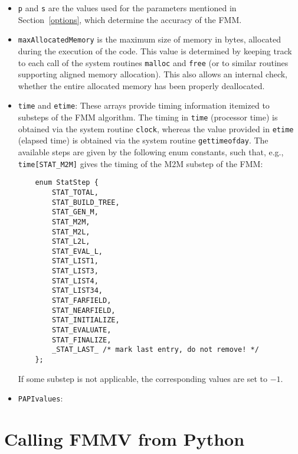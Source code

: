 \begin{itemize}
  \item \verb|p| and \verb|s| are the  values used for the parameters 
  mentioned in Section~\ref{options}, which determine the accuracy of
  the FMM.
  \item \verb|maxAllocatedMemory| is the maximum size of memory in bytes,
  allocated during the execution of the code. This value
  is determined by keeping track to each call of the system routines
  \verb|malloc| and \verb|free| (or to similar routines supporting
  aligned memory allocation).
  This also allows an internal check, whether the entire 
  allocated memory has been properly deallocated.

  \item \verb|time| and \verb|etime|:
  These arrays provide timing information
  itemized to substeps of the FMM algorithm.
  The timing in \verb|time| (processor time) is
  obtained via the system routine \verb|clock|,
  whereas the value provided in \verb|etime| (elapsed time)
  is obtained via the system routine \verb|gettimeofday|.
  The available steps are given by the following 
  enum constants, such that, e.g., \verb|time[STAT_M2M]| gives
  the timing of the M2M substep of the FMM:
\begin{verbatim}
    enum StatStep {
        STAT_TOTAL,
        STAT_BUILD_TREE, 
        STAT_GEN_M,
        STAT_M2M, 
        STAT_M2L, 
        STAT_L2L,
        STAT_EVAL_L,
        STAT_LIST1, 
        STAT_LIST3, 
        STAT_LIST4, 
        STAT_LIST34,
        STAT_FARFIELD, 
        STAT_NEARFIELD,
        STAT_INITIALIZE,
        STAT_EVALUATE,
        STAT_FINALIZE,
        _STAT_LAST_ /* mark last entry, do not remove! */	
    };
\end{verbatim}
  If some substep is not applicable, the corresponding values are set
  to $-1$.
  \item \verb|PAPIvalues|:
\end{itemize}  

\section{Calling FMMV from Python}\label{pythoninterface}

